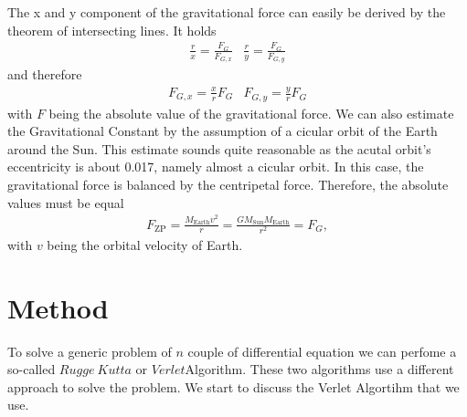 \documentclass[a4paper]{article}
\begin{document}
The x and y component of the gravitational force can easily be derived by the theorem of intersecting lines.
It holds
\begin{subequations}
\begin{align}
\frac{r}{x} = \frac{F_G}{F_{G,x}}
\end{align}
\begin{align}
\frac{r}{y} = \frac{F_G}{F_{G,y}}
\end{align}
\end{subequations}
and therefore
\begin{subequations}
\begin{align}
F_{G,x} = \frac{x}{r} F_G
\end{align}
\begin{align}
F_{G,y} = \frac{y}{r} F_G
\end{align}
\end{subequations}
with $F$ being the absolute value of the gravitational force.
\newline
We can also estimate the Gravitational Constant by the assumption of a cicular orbit of the Earth around the Sun. This estimate sounds quite reasonable as the acutal orbit's eccentricity is about 0.017, namely almost a cicular orbit.
In this case, the gravitational force is balanced by the centripetal force. Therefore, the absolute values must be equal
\begin{align}
F_{\mathrm{ZP}} = \frac{M_{\mathrm{Earth}}v^2}{r}=\frac{GM_{\mathrm{Sun}}M_{\mathrm{Earth}}}{r^2} = F_G,
\end{align}
with $v$ being the orbital velocity of Earth.

 
\section{Method}
To solve a generic problem of $n$ couple of differential equation we can perfome a so-called $Rugge \ Kutta$ or $Verlet $Algorithm. These two algorithms use a different approach to solve the problem. We start to discuss the Verlet Algortihm that we use. 
\end{document}
